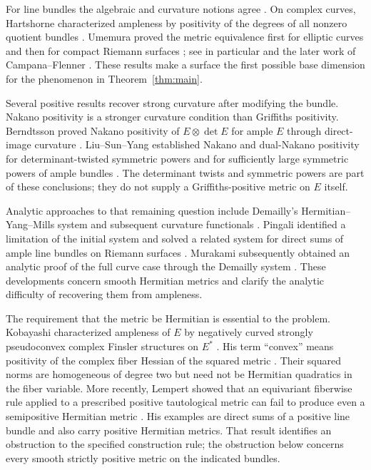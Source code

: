 For line bundles the algebraic and curvature notions agree
\cite[Proposition~1.15]{Umemura1973}. On complex curves, Hartshorne
characterized ampleness by positivity of the degrees of all nonzero
quotient bundles \cite[Theorem~2.4]{Hartshorne1971}.
Umemura proved the metric equivalence first for elliptic curves and
then for compact Riemann surfaces
\cite{Umemura1972,Umemura1973}; see in particular
\cite[Theorem~2.6]{Umemura1973} and the later work of Campana--Flenner
\cite{CampanaFlenner1990}. These results make a surface the first
possible base dimension for the phenomenon in Theorem~\ref{thm:main}.

Several positive results recover strong curvature after modifying the
bundle. Nakano positivity is a stronger curvature condition than
Griffiths positivity. Berndtsson proved Nakano positivity of $E\otimes\det E$ for
ample $E$ through direct-image curvature
\cite[Theorem~1.3]{Berndtsson2009}. Liu--Sun--Yang established
Nakano and dual-Nakano positivity for determinant-twisted symmetric
powers and for sufficiently large symmetric powers of ample bundles
\cite[Theorems~1.1--1.2 and Corollary~1.3]{LiuSunYang2013}.
The determinant twists and symmetric powers are part of these
conclusions; they do not supply a Griffiths-positive metric on $E$
itself.

Analytic approaches to that remaining question include Demailly's
Hermitian--Yang--Mills system and subsequent curvature functionals
\cite{Demailly2021,Demailly2022}. Pingali identified a limitation of
the initial system and solved a related system for direct sums of
ample line bundles on Riemann surfaces
\cite{Pingali2021,Pingali2023}. Murakami subsequently obtained an
analytic proof of the full curve case through the Demailly system
\cite[Theorem~1.2]{Murakami2026}. These developments concern smooth
Hermitian metrics and clarify the analytic difficulty of recovering
them from ampleness.

The requirement that the metric be Hermitian is essential to the
problem. Kobayashi characterized ampleness of $E$ by negatively curved
strongly pseudoconvex complex Finsler structures on $E^*$
\cite[Theorems~4.1 and~5.1]{Kobayashi1975}. His term ``convex''
means positivity of the complex fiber Hessian of the squared metric
\cite[Section~2]{Kobayashi1975}. Their squared norms are
homogeneous of degree two but need not be Hermitian quadratics in
the fiber variable. More recently, Lempert showed that an equivariant
fiberwise rule applied to a prescribed positive tautological metric
can fail to produce even a semipositive Hermitian metric
\cite[Theorem~2.1]{Lempert2026Construction}. His examples are direct sums of a
positive line bundle and also carry positive Hermitian metrics.
That result identifies an obstruction to the specified construction
rule; the obstruction below concerns every smooth strictly positive
metric on the indicated bundles.

